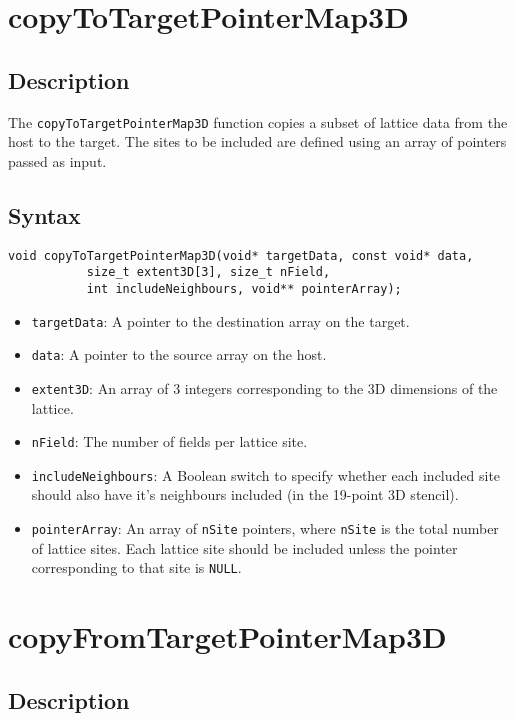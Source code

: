 \newpage
\section{copyToTargetPointerMap3D}

\subsection{Description}

The \verb+copyToTargetPointerMap3D+ function copies a subset of lattice data from the host to the target. The sites to be included are defined using an array of pointers passed as input.

\subsection{Syntax}
\begin{verbatim}
void copyToTargetPointerMap3D(void* targetData, const void* data, 
           size_t extent3D[3], size_t nField, 
           int includeNeighbours, void** pointerArray);
\end{verbatim}

\begin{itemize}
\item \verb+targetData+: A pointer to the destination array on the target.
\item \verb+data+: A pointer to the source array on the host.
\item \verb+extent3D+: An array of 3 integers corresponding to the 3D dimensions of the lattice.
\item \verb+nField+: The number of fields per lattice site.
\item \verb+includeNeighbours+: A Boolean switch to specify whether each included site should also have it's neighbours included (in the 19-point 3D stencil).
\item \verb+pointerArray+: An array of \verb+nSite+ pointers, where \verb+nSite+ is the total number of lattice sites. Each lattice site should be included unless the pointer corresponding to that site is \verb+NULL+.  
\end{itemize}

\newpage
\section{copyFromTargetPointerMap3D}

\subsection{Description}

